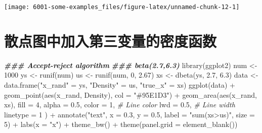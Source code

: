 \documentclass[
]{book}
\newenvironment{Shaded}{\begin{snugshade}}{\end{snugshade}}
\newcommand{\AttributeTok}[1]{\textcolor[rgb]{0.77,0.63,0.00}{#1}}
\newcommand{\CommentTok}[1]{\textcolor[rgb]{0.56,0.35,0.01}{\textit{#1}}}
\newcommand{\DecValTok}[1]{\textcolor[rgb]{0.00,0.00,0.81}{#1}}
\newcommand{\DocumentationTok}[1]{\textcolor[rgb]{0.56,0.35,0.01}{\textbf{\textit{#1}}}}
\newcommand{\FloatTok}[1]{\textcolor[rgb]{0.00,0.00,0.81}{#1}}
\newcommand{\FunctionTok}[1]{\textcolor[rgb]{0.00,0.00,0.00}{#1}}
\newcommand{\NormalTok}[1]{#1}
\newcommand{\OtherTok}[1]{\textcolor[rgb]{0.56,0.35,0.01}{#1}}
\newcommand{\SpecialCharTok}[1]{\textcolor[rgb]{0.00,0.00,0.00}{#1}}
\newcommand{\StringTok}[1]{\textcolor[rgb]{0.31,0.60,0.02}{#1}}
\begin{document}
\begin{center}\texttt{[image: 6001-some-examples\_files/figure-latex/unnamed-chunk-12-1]} \end{center}

\hypertarget{ux6563ux70b9ux56feux4e2dux52a0ux5165ux7b2cux4e09ux53d8ux91cfux7684ux5bc6ux5ea6ux51fdux6570}{%
\section{散点图中加入第三变量的密度函数}\label{ux6563ux70b9ux56feux4e2dux52a0ux5165ux7b2cux4e09ux53d8ux91cfux7684ux5bc6ux5ea6ux51fdux6570}}

\begin{Shaded}
\begin{Highlighting}[]
\DocumentationTok{\#\#\# Accept{-}reject algorithm}
\DocumentationTok{\#\#\# beta(2.7,6.3)}
\FunctionTok{library}\NormalTok{(ggplot2)}
\NormalTok{num }\OtherTok{\textless{}{-}} \DecValTok{1000}
\NormalTok{ys }\OtherTok{\textless{}{-}} \FunctionTok{runif}\NormalTok{(num)}
\NormalTok{us }\OtherTok{\textless{}{-}} \FunctionTok{runif}\NormalTok{(num, }\DecValTok{0}\NormalTok{, }\FloatTok{2.67}\NormalTok{)}
\NormalTok{xs }\OtherTok{\textless{}{-}} \FunctionTok{dbeta}\NormalTok{(ys, }\FloatTok{2.7}\NormalTok{, }\FloatTok{6.3}\NormalTok{)}
\NormalTok{data }\OtherTok{\textless{}{-}} \FunctionTok{data.frame}\NormalTok{(}\StringTok{"x\_rand"} \OtherTok{=}\NormalTok{ ys, }\StringTok{"Density"} \OtherTok{=}\NormalTok{ us, }\StringTok{"true\_x"} \OtherTok{=}\NormalTok{ xs)}
\FunctionTok{ggplot}\NormalTok{(data) }\SpecialCharTok{+}
  \FunctionTok{geom\_point}\NormalTok{(}\FunctionTok{aes}\NormalTok{(x\_rand, Density), }\AttributeTok{col =} \StringTok{"\#95E1D3"}\NormalTok{) }\SpecialCharTok{+}
  \FunctionTok{geom\_area}\NormalTok{(}\FunctionTok{aes}\NormalTok{(x\_rand, xs),}
    \AttributeTok{fill =} \DecValTok{4}\NormalTok{, }\AttributeTok{alpha =} \FloatTok{0.5}\NormalTok{,}
    \AttributeTok{color =} \DecValTok{1}\NormalTok{, }\CommentTok{\# Line color}
    \AttributeTok{lwd =} \FloatTok{0.5}\NormalTok{, }\CommentTok{\# Line width}
    \AttributeTok{linetype =} \DecValTok{1}
\NormalTok{  ) }\SpecialCharTok{+}
  \FunctionTok{annotate}\NormalTok{(}\StringTok{"text"}\NormalTok{, }\AttributeTok{x =} \FloatTok{0.3}\NormalTok{, }\AttributeTok{y =} \FloatTok{0.5}\NormalTok{, }\AttributeTok{label =} \StringTok{"sum(xs\textgreater{}us)"}\NormalTok{, }\AttributeTok{size =} \DecValTok{5}\NormalTok{) }\SpecialCharTok{+}
  \FunctionTok{labs}\NormalTok{(}\AttributeTok{x =} \StringTok{"x"}\NormalTok{) }\SpecialCharTok{+}
  \FunctionTok{theme\_bw}\NormalTok{() }\SpecialCharTok{+}
  \FunctionTok{theme}\NormalTok{(}\AttributeTok{panel.grid =} \FunctionTok{element\_blank}\NormalTok{())}
\end{Highlighting}
\end{Shaded}
\end{document}
